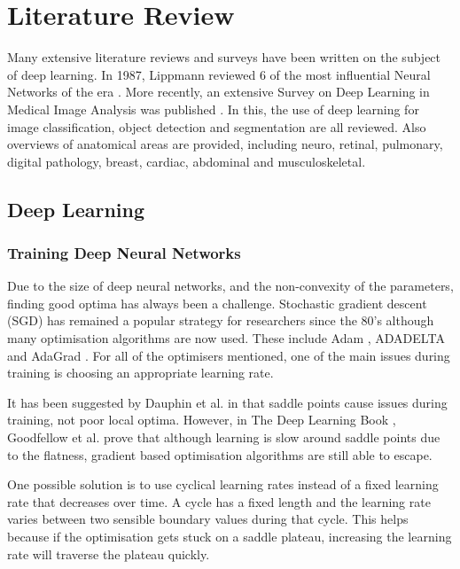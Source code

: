 
\chapter{Literature Review}\label{cha:literature}

Many extensive literature reviews and surveys have been written on the subject of deep learning.
In 1987, Lippmann reviewed 6 of the most influential Neural Networks of the era \cite{Lippmann_1987}.
More recently, an extensive Survey on Deep Learning in Medical Image Analysis was published \cite{Litjens_Kooi_Bejnordi_Setio_Ciompi_Ghafoorian_van_der_Laak_van_Ginneken_Sanchez_2017}.
In this, the use of deep learning for image classification, object detection and segmentation are all reviewed.
Also overviews of anatomical areas are provided, including neuro, retinal, pulmonary, digital pathology, breast, cardiac, abdominal and musculoskeletal.

\section{Deep Learning}\label{sec:deep_learning_lit}

\subsection{Training Deep Neural Networks}\label{subsec:training}
Due to the size of deep neural networks, and the non-convexity of the parameters, finding good optima has always been a challenge.
Stochastic gradient descent (SGD) has remained a popular strategy for researchers since the 80's although many optimisation algorithms are now used.
These include Adam \cite{Kingma_Ba_2014}, ADADELTA \cite{Zeiler_2012} and AdaGrad \cite{Duchi_Hazan_Singer_2011}.
For all of the optimisers mentioned, one of the main issues during training is choosing an appropriate learning rate.

It has been suggested by Dauphin et al. in \cite{Dauphin_de_Vries_Bengio_2015} that saddle points cause issues during training, not poor local optima.
However, in The Deep Learning Book \cite{Goodfellow-et-al-2016}, Goodfellow et al. prove that although learning is slow around saddle points due to the flatness, gradient based optimisation algorithms are still able to escape.

One possible solution is to use cyclical learning rates instead of a fixed learning rate that decreases over time.
A cycle has a fixed length and the learning rate varies between two sensible boundary values during that cycle.
This helps because if the optimisation gets stuck on a saddle plateau, increasing the learning rate will traverse the plateau quickly.

